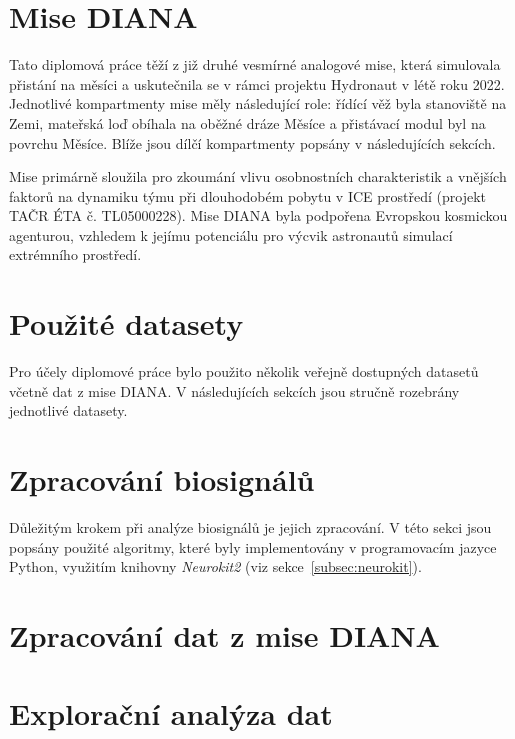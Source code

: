 \section{Mise DIANA}
\label{sec:mise_diana}
Tato diplomová práce těží z již druhé vesmírné analogové mise, která simulovala
přistání na měsíci a uskutečnila se v rámci projektu Hydronaut v létě roku 2022.
Jednotlivé kompartmenty mise měly následující role: řídící věž byla stanoviště
na Zemi, mateřská loď obíhala na oběžné dráze Měsíce a přistávací modul byl na
povrchu Měsíce. Blíže jsou dílčí kompartmenty popsány v následujících sekcích.

Mise primárně sloužila pro zkoumání vlivu osobnostních charakteristik a vnějších
faktorů na dynamiku týmu při dlouhodobém pobytu v \gls{ICE} prostředí (projekt
TAČR ÉTA č. TL05000228). Mise DIANA byla podpořena Evropskou kosmickou
agenturou, vzhledem k jejímu potenciálu pro výcvik astronautů simulací
extrémního prostředí. 


\section{Použité datasety}
\label{sec:datasety}
Pro účely diplomové práce bylo použito několik veřejně dostupných datasetů
včetně dat z mise DIANA. V následujících sekcích jsou stručně rozebrány
jednotlivé datasety.


\section{Zpracování biosignálů}
\label{sec:zpracovani_biosignalu}
Důležitým krokem při analýze biosignálů je jejich zpracování. V této sekci jsou
popsány použité algoritmy, které byly implementovány v programovacím jazyce
Python, využitím knihovny \textit{Neurokit2} (viz sekce~\ref{subsec:neurokit}).


\section{Zpracování dat z mise DIANA}
\label{sec:zpracovani_dat_diana}


\section{Explorační analýza dat}
\label{sec:exploracni_analyza}


